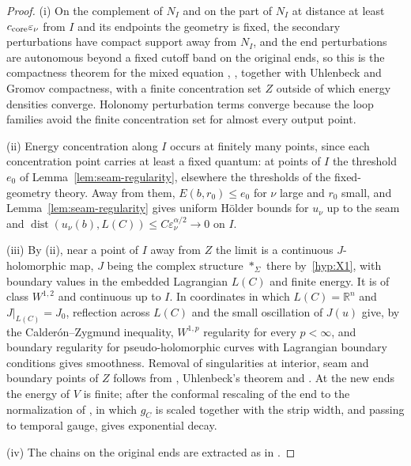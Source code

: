 \documentclass[11pt]{amsart}
\theoremstyle{definition}
\theoremstyle{remark}
\theoremstyle{plain}
\numberwithin{equation}{section}
\newcommand{\RR}{\mathbb{R}}
\newcommand{\eps}{\varepsilon}
\newcommand{\dist}{\operatorname{dist}}
\begin{document}
\begin{proof}
(i) On the complement of $N_I$ and on the part of $N_I$ at distance at least
$c_{\rm core}\eps_\nu$ from $I$ and its endpoints the geometry is fixed, the secondary perturbations have
compact support away from $N_I$, and the end perturbations are autonomous beyond a fixed cutoff
band on the original ends, so this is the compactness theorem
for the mixed equation \cite[Theorem~5.2]{DFL},
\cite[Theorem~3 and Theorem~4.44]{DFL-mixed}, together with Uhlenbeck and
Gromov compactness, with a finite concentration set $Z$ outside of which
energy densities converge. Holonomy perturbation terms converge because
the loop families avoid the finite concentration set for almost every
output point.

(ii) Energy concentration along $I$ occurs at finitely many points, since
each concentration point carries at least a fixed quantum: at points of $I$
the threshold $e_0$ of Lemma~\ref{lem:seam-regularity}, elsewhere the
thresholds of the fixed-geometry theory. Away from
them, $E(b,r_0)\le e_0$ for $\nu$ large and $r_0$ small, and
Lemma~\ref{lem:seam-regularity} gives uniform Hölder bounds for $u_\nu$ up
to the seam and $\dist(u_\nu(b),L(C))\le C\eps_\nu^{\alpha/2}\to0$ on $I$.

(iii) By (ii), near a point of $I$ away from $Z$ the limit is a continuous
$J$-holomorphic map, $J$ being the complex structure $*_\Sigma$ there by~\ref{hyp:X1},
with boundary values in the embedded Lagrangian $L(C)$ and finite energy.
It is of class $W^{1,2}$ and continuous up to $I$. In coordinates in which
$L(C)=\RR^n$ and $J|_{L(C)}=J_0$, reflection across $L(C)$ and the small
oscillation of $J(u)$ give, by the Calder\'on--Zygmund inequality, $W^{1,p}$
regularity for every $p<\infty$, and boundary regularity for
pseudo-holomorphic curves with Lagrangian boundary conditions
\cite[Theorem~B.4.1]{MS} gives smoothness.
Removal of singularities at interior, seam and boundary points of $Z$
follows from \cite[Theorem~4.44]{DFL-mixed}, Uhlenbeck's theorem and
\cite[Theorem~4.1.2]{MS}. At the new ends the energy of $V$ is finite; after
the conformal rescaling of the end to the normalization of \cite{DFL}, in which
$g_C$ is scaled together with the strip width, and passing to temporal
gauge, \cite[Proposition~5.29]{DFL} gives exponential decay.

(iv) The chains on the original ends are extracted as in
\cite[Section~5.4]{DFL}.
\end{proof}
\end{document}
